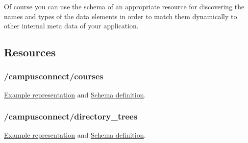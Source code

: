 Of course you can use the schema of an appropriate resource for discovering the
names and types of the data elements in order to match them dynamically to
other internal meta data of your application.


\hypertarget{campusconnect\_resources}{}
\subsection{Resources}

\hypertarget{campusconnect\_cources}{}
\subsubsection{/campusconnect/courses}
\href{https://ecs.uni-stuttgart.de/ecsa-wiki/CampusConnect/Arbeitspakete/EcsREST/CmsCourses}{Example representation} and
\href{http://repo.or.cz/w/ecs.git/blob\_plain/HEAD:/campusconnect/schemas/cc\_courses.schema.json}{Schema definition}.

\hypertarget{campusconnect\_directory\_trees}{}
\subsubsection{/campusconnect/directory\_trees}
\href{https://ecs.uni-stuttgart.de/ecsa-wiki/CampusConnect/Arbeitspakete/EcsREST/CmsDirectoryTrees}{Example representation} and
\href{http://repo.or.cz/w/ecs.git/blob\_plain/HEAD:/campusconnect/schemas/cc\_directory\_trees.schema.json}{Schema definition}.



